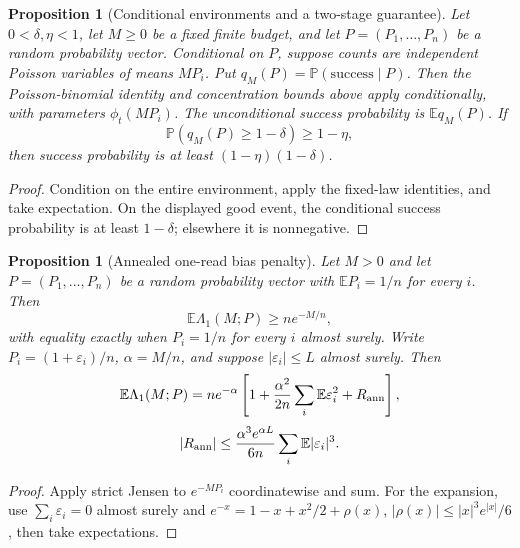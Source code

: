 \documentclass[11pt]{article}
\newtheorem{proposition}[theorem]{Proposition}
\theoremstyle{definition}
\theoremstyle{remark}
\newcommand{\E}{\mathbb E}
\newcommand{\Pbb}{\mathbb P}
\newcommand{\1}{\mathbf 1}
\begin{document}
\begin{proposition}[Conditional environments and a two-stage guarantee]
\label{thm:random-environment}
Let \(0<\delta,\eta<1\), let \(M\ge0\) be a fixed finite budget,
and let \(P=(P_1,\ldots,P_n)\) be a random probability vector.
Conditional on \(P\), suppose counts are independent Poisson variables of means
\(MP_i\). Put \(q_M(P)=\Pbb(\mathrm{success}\mid P)\).
Then the Poisson-binomial identity and concentration bounds above apply
conditionally, with parameters \(\phi_t(MP_i)\). The unconditional
success probability is \(\E q_M(P)\). If
\[
 \Pbb(q_M(P)\ge1-\delta)\ge1-\eta,
\]
then success probability is at least \((1-\eta)(1-\delta)\).
\end{proposition}
\begin{proof}
Condition on the entire environment, apply the fixed-law identities,
and take expectation. On the displayed good event, the conditional
success probability is at least \(1-\delta\); elsewhere it is
nonnegative.
\end{proof}

\begin{proposition}[Annealed one-read bias penalty]\label{thm:annealed-jensen}
Let \(M>0\) and let \(P=(P_1,\ldots,P_n)\) be a random probability
vector with \(\E P_i=1/n\) for every \(i\). Then
\[
 \E\Lambda_1(M;P)\ge ne^{-M/n},
\]
with equality exactly when \(P_i=1/n\) for every \(i\) almost surely.
Write \(P_i=(1+\varepsilon_i)/n\), \(\alpha=M/n\), and suppose
\(|\varepsilon_i|\le L\) almost surely. Then
\[
 \E\Lambda_1(M;P)
 =ne^{-\alpha}\left[1+\frac{\alpha^2}{2n}\sum_i\E\varepsilon_i^2
                         +R_{\rm ann}\right],
\]
\[
 |R_{\rm ann}|\le\frac{\alpha^3e^{\alpha L}}{6n}
                         \sum_i\E|\varepsilon_i|^3.
\]
\end{proposition}
\begin{proof}
Apply strict Jensen to \(e^{-MP_i}\) coordinatewise and sum.
For the expansion, use \(\sum_i\varepsilon_i=0\) almost surely and
\(e^{-x}=1-x+x^2/2+\rho(x)\),
\(|\rho(x)|\le |x|^3e^{|x|}/6\), then take expectations.
\end{proof}
\end{document}
